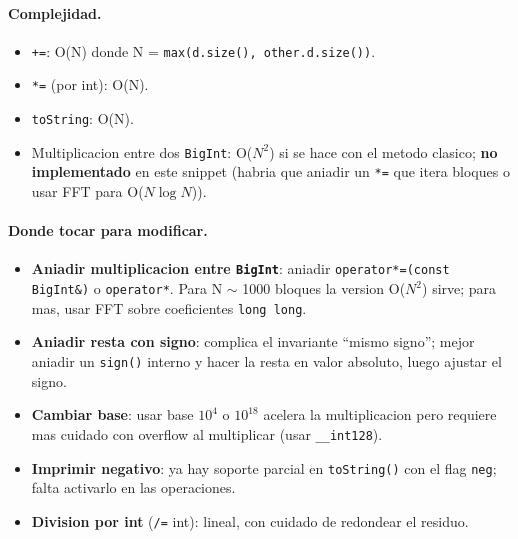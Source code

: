 \paragraph{Complejidad.}
\begin{itemize}\setlength\itemsep{0pt}
	\item \texttt{+=}: O(N) donde N = \texttt{max(d.size(), other.d.size())}.
	\item \texttt{*=} (por int): O(N).
	\item \texttt{toString}: O(N).
	\item Multiplicacion entre dos \texttt{BigInt}: O($N^2$) si se hace con el metodo clasico; \textbf{no implementado} en este snippet (habria que aniadir un \texttt{*=} que itera bloques o usar FFT para O($N \log N$)).
\end{itemize}

\paragraph{Donde tocar para modificar.}
\begin{itemize}\setlength\itemsep{0pt}
	\item \textbf{Aniadir multiplicacion entre \texttt{BigInt}}: aniadir \texttt{operator*=(const BigInt\&)} o \texttt{operator*}. Para N $\sim$ 1000 bloques la version O($N^2$) sirve; para mas, usar FFT sobre coeficientes \texttt{long long}.
	\item \textbf{Aniadir resta con signo}: complica el invariante ``mismo signo''; mejor aniadir un \texttt{sign()} interno y hacer la resta en valor absoluto, luego ajustar el signo.
	\item \textbf{Cambiar base}: usar base $10^4$ o $10^{18}$ acelera la multiplicacion pero requiere mas cuidado con overflow al multiplicar (usar \texttt{\_\_int128}).
	\item \textbf{Imprimir negativo}: ya hay soporte parcial en \texttt{toString()} con el flag \texttt{neg}; falta activarlo en las operaciones.
	\item \textbf{Division por int} (\texttt{/=} int): lineal, con cuidado de redondear el residuo.
\end{itemize}

